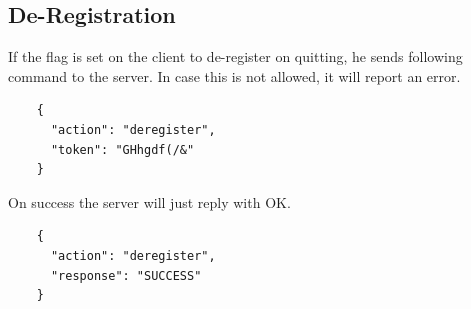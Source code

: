 \documentclass{article}
\begin{document}
	\subsection*{De-Registration}
	If the flag is set on the client to de-register on quitting, he sends following command to the server. In case this is not allowed, it will report an error.
	\begin{verbatim}
	{
	  "action": "deregister", 
	  "token": "GHhgdf(/&"
	}
	\end{verbatim}
	On success the server will just reply with OK.
	\begin{verbatim}
	{
	  "action": "deregister",
	  "response": "SUCCESS"
	}
	\end{verbatim}
\end{document}
